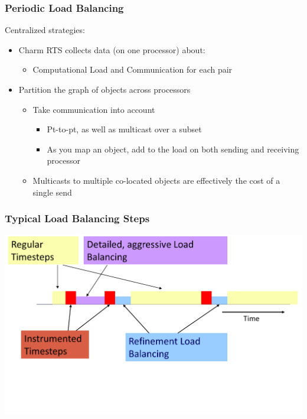 \begin{frame}[fragile]
\frametitle{Periodic Load Balancing}

Centralized strategies:
\begin{itemize}
 \item Charm RTS collects data (on one processor) about:
 \begin{itemize}
  \item Computational Load and Communication for each pair
 \end{itemize}
 \item Partition the graph of objects across processors
 \begin{itemize}
  \item Take communication into account
  \begin{itemize}
   \item Pt-to-pt, as well as multicast over a subset
   \item As you map an object, add to the load on both sending and receiving processor
  \end{itemize}
  \item Multicasts to multiple co-located objects are effectively the cost of a single send
 \end{itemize}
\end{itemize}
\end{frame}

\begin{frame}[fragile]
\frametitle{Typical Load Balancing Steps}
\begin{centering}
\includegraphics[width=1.0\textwidth]{figures/LBStepsDiagram}
\end{centering}
\end{frame}

